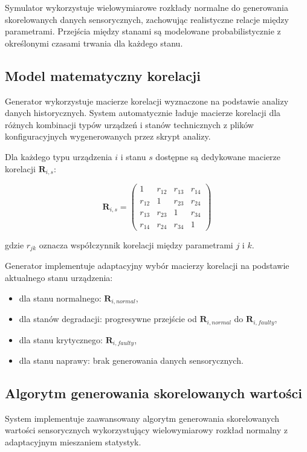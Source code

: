 Symulator wykorzystuje wielowymiarowe rozkłady normalne do generowania skorelowanych danych sensorycznych, zachowując realistyczne relacje między parametrami. Przejścia między stanami są modelowane probabilistycznie z określonymi czasami trwania dla każdego stanu.


\subsection{Model matematyczny korelacji}
\label{subsec:model_korelacji}

Generator wykorzystuje macierze korelacji wyznaczone na podstawie analizy danych historycznych. System automatycznie ładuje macierze korelacji dla różnych kombinacji typów urządzeń i stanów technicznych z plików konfiguracyjnych wygenerowanych przez skrypt analizy.

Dla każdego typu urządzenia $i$ i stanu $s$ dostępne są dedykowane macierze korelacji $\mathbf{R}_{i,s}$:

$$\mathbf{R}_{i,s} = \begin{pmatrix}
1 & r_{12} & r_{13} & r_{14} \\
r_{12} & 1 & r_{23} & r_{24} \\
r_{13} & r_{23} & 1 & r_{34} \\
r_{14} & r_{24} & r_{34} & 1
\end{pmatrix}$$

gdzie $r_{jk}$ oznacza współczynnik korelacji między parametrami $j$ i $k$.

Generator implementuje adaptacyjny wybór macierzy korelacji na podstawie aktualnego stanu urządzenia:
\begin{itemize}
    \item dla stanu normalnego: $\mathbf{R}_{i,normal}$,
    \item dla stanów degradacji: progresywne przejście od $\mathbf{R}_{i,normal}$ do $\mathbf{R}_{i,faulty}$,
    \item dla stanu krytycznego: $\mathbf{R}_{i,faulty}$,
    \item dla stanu naprawy: brak generowania danych sensorycznych.
\end{itemize}

\subsection{Algorytm generowania skorelowanych wartości}
\label{subsec:algorytm_generowania}

System implementuje zaawansowany algorytm generowania skorelowanych wartości sensorycznych wykorzystujący wielowymiarowy rozkład normalny z adaptacyjnym mieszaniem statystyk.

